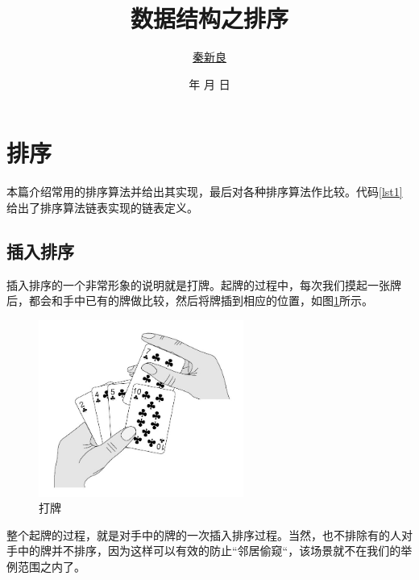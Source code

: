 \documentclass[a4paper, 12pt, titlepage]{article}
\newcommand*{\TitleFont}{\usefont{\encodingdefault}{\rmdefault}{b}{n}\fontsize{32}{40}\selectfont\CJKfamily{title}\color{seco}}%
\renewcommand{\today}{\color{seco}\number\year 年 \number\month 月 \number\day 日}
\begin{document}
\setlength{\parindent}{2em}

\title{\TitleFont 数据结构之排序\vspace{8cm}}
\author{\href{mailto:q00148943@gmail.com}{\LARGE{秦新良}}}
\date{\vspace{0.5cm}\today}

\maketitle

\tableofcontents
\newpage


\section{排序}
本篇介绍常用的排序算法并给出其实现，最后对各种排序算法作比较。代码\ref{lst1}给出了排序算法链表实现的链表定义。
\begin{spacing}{1.0}
  
\end{spacing}

\subsection{插入排序}
\label{subsec:labelsub1}
插入排序的一个非常形象的说明就是打牌。起牌的过程中，每次我们摸起一张牌后，都会和手中已有的牌做比较，然后将牌插到相应的位置，如图\ref{fig00}所示。
\begin{figure}[!htbp]
  \setlength{\abovecaptionskip}{0pt}
  \centering
  \includegraphics[width=0.6\textwidth]{playing_cards.jpg}
  \caption{打牌}
  \label{fig00}
\end{figure}


整个起牌的过程，就是对手中的牌的一次插入排序过程。当然，也不排除有的人对手中的牌并不排序，因为这样可以有效的防止“邻居偷窥“，该场景就不在我们的举例范围之内了。
\end{document}

